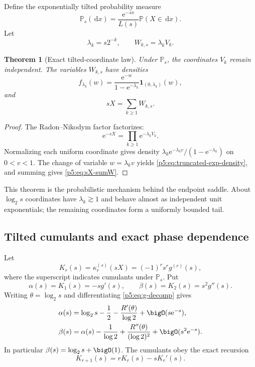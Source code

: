\documentclass[11pt]{article}
\numberwithin{equation}{section}
\newtheorem{theorem}{Theorem}[section]
\theoremstyle{definition}
\theoremstyle{remark}
\newcommand{\Prob}{\mathbb P}
\newcommand{\dd}{\,\mathrm d}
\newcommand{\e}{\mathrm e}
\begin{document}
Define the exponentially tilted probability measure
\begin{equation}\label{p5:eq:tilt-def}
 \Prob_s(\dd x)=\frac{\e^{-sx}}{L(s)}\Prob(X\in\dd x).
\end{equation}
Let
\begin{equation}\label{p5:eq:lambda-W}
 \lambda_k=s2^{-k},\qquad W_{k,s}=\lambda_kV_k.
\end{equation}

\begin{theorem}[Exact tilted-coordinate law]\label{p5:thm:tilted-coordinates}
Under $\Prob_s$, the coordinates $V_k$ remain independent.  The variables
$W_{k,s}$ have densities
\begin{equation}\label{p5:eq:truncated-exp-density}
 f_{\lambda_k}(w)=
 \frac{\e^{-w}}{1-\e^{-\lambda_k}}
 \bm1_{(0,\lambda_k)}(w),
\end{equation}
and
\begin{equation}\label{p5:eq:sX-sumW}
 sX=\sum_{k\ge1}W_{k,s}.
\end{equation}
\end{theorem}

\begin{proof}
The Radon--Nikodym factor factorizes:
\[
 \e^{-sX}=\prod_{k\ge1}\e^{-\lambda_kV_k}.
\]
Normalizing each uniform coordinate gives density
$\lambda_k\e^{-\lambda_kv}/(1-\e^{-\lambda_k})$ on $0<v<1$.
The change of variable $w=\lambda_kv$ yields
\cref{p5:eq:truncated-exp-density}, and summing gives \cref{p5:eq:sX-sumW}.
\end{proof}

This theorem is the probabilistic mechanism behind the endpoint saddle.  About
$\log_2s$ coordinates have $\lambda_k\gtrsim1$ and behave almost as independent
unit exponentials; the remaining coordinates form a uniformly bounded tail.

\subsection{Tilted cumulants and exact phase dependence}

Let
\begin{equation}\label{p5:eq:K-r-def}
 K_r(s)=\kappa_r^{(s)}(sX)=(-1)^rs^rg^{(r)}(s),
\end{equation}
where the superscript indicates cumulants under $\Prob_s$.  Put
\begin{equation}\label{p5:eq:alpha-beta}
 \alpha(s)=K_1(s)=-sg'(s),\qquad
 \beta(s)=K_2(s)=s^2g''(s).
\end{equation}
Writing $\theta=\log_2s$ and differentiating \cref{p5:eq:g-decomp} gives
\begin{align}
 \alpha(s)&=\log_2s-\frac12-
 \frac{R'(\theta)}{\log2}+\bigO(s\e^{-s}),
 \label{p5:eq:alpha-asymp}\\
 \beta(s)&=\alpha(s)-\frac1{\log2}
 +\frac{R''(\theta)}{(\log2)^2}+\bigO(s^2\e^{-s}).
 \label{p5:eq:beta-asymp}
\end{align}
In particular $\beta(s)=\log_2s+\bigO(1)$.  The cumulants obey the exact
recursion
\begin{equation}\label{p5:eq:K-recur}
 K_{r+1}(s)=rK_r(s)-sK_r'(s).
\end{equation}
\end{document}
